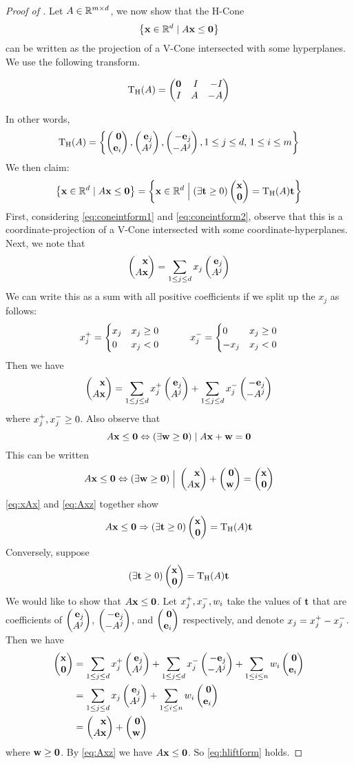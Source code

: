 \begin{proof}[Proof of ]
	Let $A \in \mathbb{R}^{{m}\times d}$, we now show that the H-Cone
	\[\left\{\mathbf{x} \in \mathbb{R}^d \;|\; A\mathbf{x} \leq \mathbf{0}\right\}\]
	can be written as the projection of a V-Cone intersected with some hyperplanes.  We use the following transform.
  \begin{Transform}\label{hconelift_transform}
  \[\HLift(A) = \pmb \0 & I & -I \\ I & A & -A \pme \]
  \end{Transform}
  In other words,
  \[\HLift(A) =  \set{\zei, \eAj, \neAj, 1 \leq j \leq d,\, 1 \leq i \leq m}\]
	We then claim:
	\begin{equation}\label{eq:hliftform}
		\set{\xv \st A\x \leq \0} = \set{\xv \St (\exists \t \geq 0) \xz = \HLift(A)\t}
	\end{equation}
	First, considering \eqref{eq:coneintform1} and \eqref{eq:coneintform2}, observe that this is a coordinate-projection of a V-Cone intersected with some coordinate-hyperplanes.
	Next, we note that
	\[ \xAx = \jsum x_j \eAj \]
	We can write this as a sum with all positive coefficients if we split up the $x_j$ as follows:
	\[
		x_j^+ = \begin{cases} x_j & x_j \geq 0 \\ 0 & x_j < 0 \end{cases} \quad\quad\quad
		x_j^- = \begin{cases} 0 & x_j \geq 0 \\ -x_j & x_j < 0 \end{cases}
	\]
	Then we have
	\begin{equation} \label{eq:xAx}
		\xAx = \jsum \xjp \eAj + \jsum \xjm \neAj
	\end{equation}
	where $x_j^+, x_j^- \geq 0$.  Also observe that
	\[ A\mathbf{x} \leq \mathbf{0} \Leftrightarrow (\exists \mathbf{w} \geq \mathbf{0}) \;|\; A\mathbf{x} + \mathbf{w} = \mathbf{0} \]
	This can be written
	\begin{equation} \label{eq:Axz}
		A\x \leq \0 \Leftrightarrow (\exists \w \geq \0) \St \xAx + \zw = \xz
	\end{equation}
	\eqref{eq:xAx} and \eqref{eq:Axz} together show
	\[ A\x \leq \0 \Rightarrow (\exists \t \geq 0) \xz = \HLift(A)\t \]
	Conversely, suppose
	\[ (\exists \t \geq 0) \xz = \HLift(A)\t \]
	We would like to show that $A\mathbf{x} \leq \mathbf{0}$.  Let $x_j^+,x_j^-,w_i$ take the values of $\mathbf{t}$ that are coefficients of $\eAj$, $\neAj$, and $\zei$ respectively, and denote $x_j = x_j^+ - x_j^-$.  Then we have
	\begin{align*}
		\xz & = \jsum \xjp \eAj + \jsum \xjm \neAj + \isum w_i\zei \\
		    & = \jsum x_j \eAj + \isum w_i\zei                     \\
		    & = \xAx + \zw
	\end{align*}
	where $\mathbf{w} \geq \mathbf{0}$.  By \eqref{eq:Axz} we have $A\mathbf{x} \leq \mathbf{0}$.  So \eqref{eq:hliftform} holds.
\end{proof}

